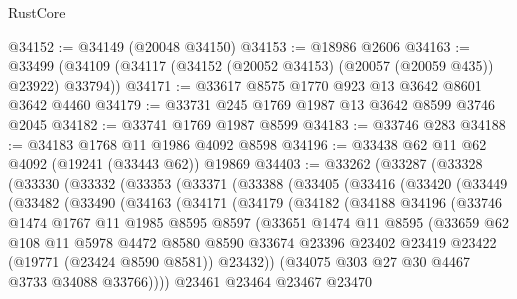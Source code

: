 \begin{lexlean}{RustCore}
\begin{coremodule}
@34152 := @34149 (@20048 @34150)
@34153 := @18986 @2606
@34163 := @33499 (@34109 (@34117 (@34152 (@20052 @34153) (@20057 (@20059 @435)) @23922) @33794))
@34171 := @33617 @8575 @1770 @923 @13 @3642 @8601 @3642 @4460
@34179 := @33731 @245 @1769 @1987 @13 @3642 @8599 @3746 @2045
@34182 := @33741 @1769 @1987 @8599
@34183 := @33746 @283
@34188 := @34183 @1768 @11 @1986 @4092 @8598
@34196 := @33438 @62 @11 @62 @4092 (@19241 (@33443 @62)) @19869
@34403 := @33262
    (@33287
      (@33328
        (@33330
          (@33332
            (@33353
              (@33371
                (@33388
                  (@33405
                    (@33416
                      (@33420
                        (@33449
                          (@33482
                            (@33490
                              (@34163
                                (@34171
                                  (@34179
                                    (@34182
                                      (@34188
                                        @34196
                                        (@33746
                                          @1474
                                          @1767
                                          @11
                                          @1985
                                          @8595
                                          @8597
                                          (@33651
                                            @1474
                                            @11
                                            @8595
                                            (@33659
                                              @62
                                              @108
                                              @11
                                              @5978
                                              @4472
                                              @8580
                                              @8590
                                              @33674
                                              @23396
                                              @23402
                                              @23419
                                              @23422
                                              (@19771 (@23424 @8590 @8581))
                                              @23432))
                                          (@34075 @303 @27 @30 @4467 @3733 @34088 @33766))))
                                    @23461
                                    @23464
                                    @23467
                                    @23470

\end{coremodule}
\end{lexlean}
